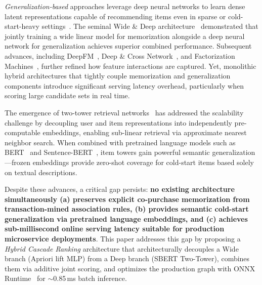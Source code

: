 \documentclass[10pt,conference]{IEEEtran}
\begin{document}
\textit{Generalization-based} approaches leverage deep neural networks to learn dense latent representations capable of recommending items even in sparse or cold-start-heavy settings~\cite{he2017neural, cheng2016wide}. The seminal Wide \& Deep architecture~\cite{cheng2016wide} demonstrated that jointly training a wide linear model for memorization alongside a deep neural network for generalization achieves superior combined performance. Subsequent advances, including DeepFM~\cite{guo2017deepfm}, Deep \& Cross Network~\cite{wang2017deep}, and Factorization Machines~\cite{rendle2010factorization}, further refined how feature interactions are captured. Yet, monolithic hybrid architectures that tightly couple memorization and generalization components introduce significant serving latency overhead, particularly when scoring large candidate sets in real time.

The emergence of two-tower retrieval networks~\cite{covington2016deep, yi2019sampling, yang2020mixed} has addressed the scalability challenge by decoupling user and item representations into independently pre-computable embeddings, enabling sub-linear retrieval via approximate nearest neighbor search. When combined with pretrained language models such as BERT~\cite{devlin2019bert} and Sentence-BERT~\cite{reimers2019sentence}, item towers gain powerful semantic generalization---frozen embeddings provide zero-shot coverage for cold-start items based solely on textual descriptions.

Despite these advances, a critical gap persists: \textbf{no existing architecture simultaneously (a) preserves explicit co-purchase memorization from transaction-mined association rules, (b) provides semantic cold-start generalization via pretrained language embeddings, and (c) achieves sub-millisecond online serving latency suitable for production microservice deployments}. This paper addresses this gap by proposing a \textit{Hybrid Cascade Ranking} architecture that architecturally decouples a Wide branch (Apriori lift MLP) from a Deep branch (SBERT Two-Tower), combines them via additive joint scoring, and optimizes the production graph with ONNX Runtime~\cite{vaswani2017attention} for $\sim$0.85\,ms batch inference.
\end{document}
